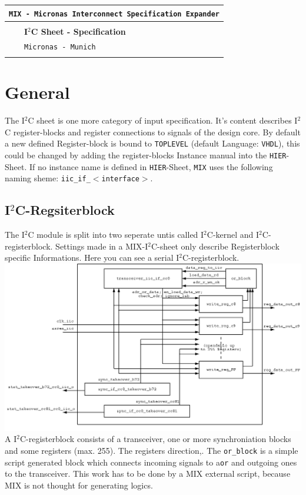 \documentclass[a4paper,12pt]{report}
\begin{document}
\begin{titlepage}
\vspace*{70mm}
\centering
\begin{tabular}{p{20mm}l}
\multicolumn{2}{r}{\tt {MIX} - Micronas Interconnect Specification Expander}\\[1mm]
\hline \\[3mm]
&{\bf I$^2$C Sheet - Specification}\\[5mm]
&{\tt Micronas - Munich}\\[5mm]
\hline \\[20mm]
\end{tabular}
\end{titlepage}


\raggedright

   \section{General}
The I$^2$C sheet is one more category of input specification. It's content describes I$^2$C register-blocks and register connections to signals of the design core. By default a new defined Register-block is bound to {\tt TOPLEVEL} (default Language: {\tt VHDL}), this could be changed by adding the register-blocks Instance manual into the {\tt HIER}-Sheet. If no instance name is defined in {\tt HIER}-Sheet, {\tt MIX} uses the following naming sheme: {\tt iic\_if\_$<$interface$>$}.

\subsection{I$^2$C-Regsiterblock}
The I$^2$C module is split into two seperate untis called I$^2$C-kernel and I$^2$C-registerblock. Settings made in a MIX-I$^2$C-sheet only describe Registerblock specific Informations. Here you can see a serial I$^2$C-registerblock.\newline
\includegraphics[scale=0.37]{images/serial_iic_reg.png}\newline
A I$^2$C-registerblock consists of a transceiver, one or more synchroniation blocks and some registers (max. 255). The registers direction,. The {\tt or\_block} is a simple script generated block which connects incoming signals to a{\tt or} and outgoing ones to the transceiver. This work has to be done by a MIX external script, because MIX is not thought for generating logics.
\end{document}
